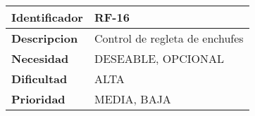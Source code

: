 \begin{center}
    \begin{tabular}{|p{2.6cm}|p{12cm}|}
    \hline
    \textbf{Identificador} & RF-16\\
    \hline
    \textbf{Descripcion} & Control de regleta de enchufes\\
    \hline
    \textbf{Necesidad} & DESEABLE, OPCIONAL\\
    \hline
    \textbf{Dificultad} & ALTA\\
    \hline
    \textbf{Prioridad} & MEDIA, BAJA\\
    \hline
    \end{tabular}
\end{center}
